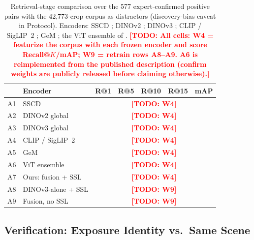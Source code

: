 \documentclass[letterpaper]{article} %
\newcommand{\todo}[1]{\textcolor{red}{\textbf{[TODO: #1]}}}
\begin{document}
\begin{table}[t]
\centering
\footnotesize
\setlength{\tabcolsep}{3.5pt}
\begin{tabular}{@{}llccccc@{}}
\toprule
& Encoder & R@1 & R@5 & R@10 & R@15 & mAP \\
\midrule
A1 & SSCD & \multicolumn{5}{c}{\todo{W4}} \\
A2 & DINOv2 global & \multicolumn{5}{c}{\todo{W4}} \\
A3 & DINOv3 global & \multicolumn{5}{c}{\todo{W4}} \\
A4 & CLIP / SigLIP~2 & \multicolumn{5}{c}{\todo{W4}} \\
A5 & GeM & \multicolumn{5}{c}{\todo{W4}} \\
A6 & ViT ensemble & \multicolumn{5}{c}{\todo{W4}} \\
A7 & Ours: fusion + SSL & \multicolumn{5}{c}{\todo{W4}} \\
A8 & DINOv3-alone + SSL & \multicolumn{5}{c}{\todo{W9}} \\
A9 & Fusion, no SSL & \multicolumn{5}{c}{\todo{W9}} \\
\bottomrule
\end{tabular}
\caption{Retrieval-stage comparison over the 577 expert-confirmed positive
pairs with the 42{,}773-crop corpus as distractors (discovery-bias caveat
in Protocol). Encoders: SSCD \cite{pizzi2022sscd}; DINOv2
\cite{oquab2024dinov2}; DINOv3 \cite{simeoni2025dinov3}; CLIP
\cite{radford2021clip} / SigLIP~2 \cite{tschannen2025siglip2}; GeM
\cite{radenovic2019gem}; the ViT ensemble of \citet{du2024probing}.
\todo{All cells: W4 = featurize the corpus with each frozen encoder and
score Recall@$K$/mAP; W9 = retrain rows A8--A9. A6 is reimplemented from
the published description (confirm weights are publicly released before
claiming otherwise).}}
\label{tab:retrieval}
\end{table}

\subsection{Verification: Exposure Identity vs.\ Same Scene}
\end{document}
